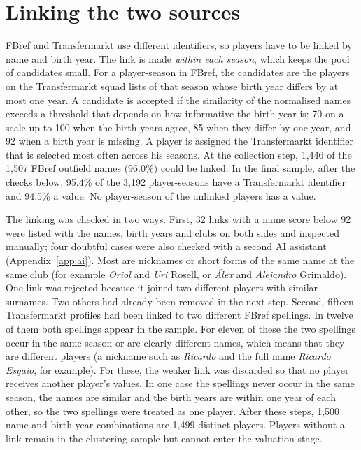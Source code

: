 \section{Linking the two sources}
\label{sec:data-linking}

FBref and Transfermarkt use different identifiers, so players have to be linked by name and birth year. The link is made \emph{within each season}, which keeps the pool of candidates small. For a player-season in FBref, the candidates are the players on the Transfermarkt squad lists of that season whose birth year differs by at most one year. A candidate is accepted if the similarity of the normalised names exceeds a threshold that depends on how informative the birth year is: 70 on a scale up to 100 when the birth years agree, 85 when they differ by one year, and 92 when a birth year is missing. A player is assigned the Transfermarkt identifier that is selected most often across his seasons. At the collection step, 1,446 of the 1,507 FBref outfield names (96.0\%) could be linked. In the final sample, after the checks below, 95.4\% of the 3,192 player-seasons have a Transfermarkt identifier and 94.5\% a value. No player-season of the unlinked players has a value.

The linking was checked in two ways. First, 32 links with a name score below 92 were listed with the names, birth years and clubs on both sides and inspected manually; four doubtful cases were also checked with a second AI assistant (Appendix~\ref{app:ai}). Most are nicknames or short forms of the same name at the same club (for example \emph{Oriol} and \emph{Uri} Rosell, or \emph{Álex} and \emph{Alejandro} Grimaldo). One link was rejected because it joined two different players with similar surnames. Two others had already been removed in the next step. Second, fifteen Transfermarkt profiles had been linked to two different FBref spellings. In twelve of them both spellings appear in the sample. For eleven of these the two spellings occur in the same season or are clearly different names, which means that they are different players (a nickname such as \emph{Ricardo} and the full name \emph{Ricardo Esgaio}, for example). For these, the weaker link was discarded so that no player receives another player's values. In one case the spellings never occur in the same season, the names are similar and the birth years are within one year of each other, so the two spellings were treated as one player. After these steps, 1,500 name and birth-year combinations are 1,499 distinct players. Players without a link remain in the clustering sample but cannot enter the valuation stage.

